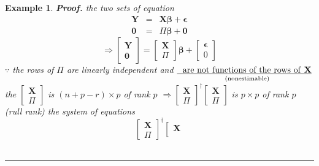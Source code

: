 \documentclass{article}
\newtheorem{example}[theorem]{Example}
\newenvironment{proof}[1][Proof]{\noindent\textbf{#1.} }{\ \rule{0.5em}{0.5em}}
\begin{document}
\begin{example}
\begin{proof}
the two sets of equation%
\begin{eqnarray*}
\mathbf{Y} &=&\mathbf{X\beta +\epsilon } \\
\mathbf{0} &=&\Pi \mathbf{\beta +0}
\end{eqnarray*}%
\begin{equation*}
\Rightarrow \left[ 
\begin{array}{c}
\mathbf{Y} \\ 
\mathbf{0}%
\end{array}%
\right] =\left[ 
\begin{array}{c}
\mathbf{X} \\ 
\Pi%
\end{array}%
\right] \mathbf{\beta +}\left[ 
\begin{array}{c}
\mathbf{\epsilon } \\ 
0%
\end{array}%
\right]
\end{equation*}%
$\because $ the rows of $\Pi $ are linearly independent and $\underset{\text{%
(nonestimable)}}{\underline{\text{are not functions of the rows of \textbf{X}%
}}}$\newline
\newline
the $\left[ 
\begin{array}{c}
\mathbf{X} \\ 
\Pi%
\end{array}%
\right] $ is $\left( n+p-r\right) \times p$ of rank $p$\newline
\newline
$\Rightarrow \left[ 
\begin{array}{c}
\mathbf{X} \\ 
\Pi%
\end{array}%
\right] ^{\dagger }\left[ 
\begin{array}{c}
\mathbf{X} \\ 
\Pi%
\end{array}%
\right] $ is $p\times p$ of rank $p$ (rull rank)\newline
\newline
the system of equations%
\begin{equation*}
\left[ 
\begin{array}{c}
\mathbf{X} \\ 
\Pi%
\end{array}%
\right] ^{\dagger }\left[ 
\begin{array}{c}
\mathbf{X} \\ 

\end{array}
\end{equation*}
\end{proof}
\end{example}
\end{document}
